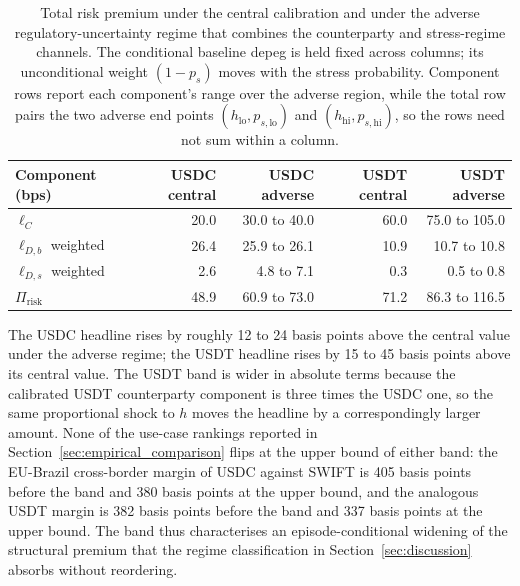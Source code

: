 \begin{table}[H]
\centering
\caption{Total risk premium under the central calibration and under the adverse regulatory-uncertainty regime that combines the counterparty and stress-regime channels. The conditional baseline depeg is held fixed across columns; its unconditional weight $(1-p_s)$ moves with the stress probability. Component rows report each component's range over the adverse region, while the total row pairs the two adverse end points $(h_{\text{lo}}, p_{s,\text{lo}})$ and $(h_{\text{hi}}, p_{s,\text{hi}})$, so the rows need not sum within a column.}\label{tab:reg_uncertainty_band}
\begin{tabular}{lrrrr}
\toprule
Component (bps)             & USDC central & USDC adverse & USDT central & USDT adverse \\
\midrule
$\ell_C$                    & 20.0  & 30.0 to 40.0  & 60.0  & 75.0 to 105.0 \\
$\ell_{D,b}$ weighted       & 26.4  & 25.9 to 26.1  & 10.9  & 10.7 to 10.8 \\
$\ell_{D,s}$ weighted       & 2.6   & 4.8 to 7.1    & 0.3   & 0.5 to 0.8 \\
\midrule
$\Pi_{\text{risk}}$         & 48.9  & 60.9 to 73.0  & 71.2  & 86.3 to 116.5 \\
\bottomrule
\end{tabular}
\end{table}

The USDC headline rises by roughly 12 to 24 basis points above the central value under the adverse regime; the USDT headline rises by 15 to 45 basis points above its central value. The USDT band is wider in absolute terms because the calibrated USDT counterparty component is three times the USDC one, so the same proportional shock to $h$ moves the headline by a correspondingly larger amount. None of the use-case rankings reported in Section~\ref{sec:empirical_comparison} flips at the upper bound of either band: the EU-Brazil cross-border margin of USDC against SWIFT is 405 basis points before the band and 380 basis points at the upper bound, and the analogous USDT margin is 382 basis points before the band and 337 basis points at the upper bound. The band thus characterises an episode-conditional widening of the structural premium that the regime classification in Section~\ref{sec:discussion} absorbs without reordering.
